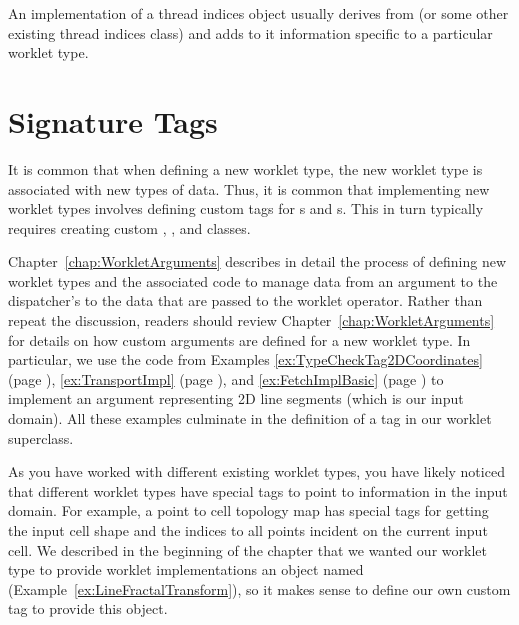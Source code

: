 An implementation of a thread indices object usually derives from  (or some other existing thread indices class) and adds to it information specific to a particular worklet type.



\section{Signature Tags}
\label{sec:NewWorkletTypes:SignatureTags}

It is common that when defining a new worklet type, the new worklet type is associated with new types of data.
Thus, it is common that implementing new worklet types involves defining custom tags for \controlsignature{}s and \executionsignature{}s.
This in turn typically requires creating custom , , and  classes.

Chapter~\ref{chap:WorkletArguments} describes in detail the process of defining new worklet types and the associated code to manage data from an argument to the dispatcher's  to the data that are passed to the worklet operator.
Rather than repeat the discussion, readers should review Chapter~\ref{chap:WorkletArguments} for details on how custom arguments are defined for a new worklet type.
In particular, we use the code from Examples \ref{ex:TypeCheckTag2DCoordinates} (page \pageref{ex:TypeCheckTag2DCoordinates}), \ref{ex:TransportImpl} (page \pageref{ex:TransportImpl}), and \ref{ex:FetchImplBasic} (page \pageref{ex:FetchImplBasic}) to implement an argument representing 2D line segments (which is our input domain).
All these examples culminate in the definition of a \controlsignature tag in our worklet superclass.


As you have worked with different existing worklet types, you have likely noticed that different worklet types have special \executionsignature tags to point to information in the input domain.
For example, a point to cell topology map has special \executionsignature tags for getting the input cell shape and the indices to all points incident on the current input cell.
We described in the beginning of the chapter that we wanted our worklet type to provide worklet implementations an object named  (Example~\ref{ex:LineFractalTransform}), so it makes sense to define our own custom \executionsignature tag to provide this object.

